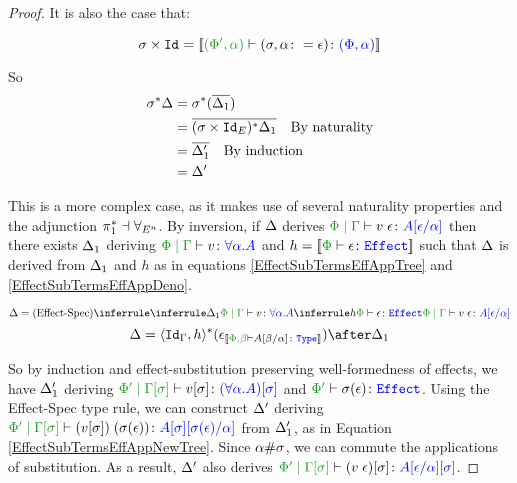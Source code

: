 \documentclass{Report}
\begin{document}
\begin{framed}
\begin{proof}
    It is also the case that:
    
    \begin{equation}
        \si\times\Id{} = \deno{\typerelation{(\P',\a)}{(\si, \a\setto\e)}{(\P,\a)}}
    \end{equation}
    
    So
    \begin{align*}
        \sigma^*\Delta &= \sigma^*(\overline{\Delta_1})\\
        & = \overline{(\sigma\times\texttt{Id}_{E})^*\Delta_1}\quad\text{By naturality}\\
        & = \overline{\Delta_1'}\quad\text{By induction}\\
        & = \Delta'
    \end{align*}
    
    \case{\vspec}
    
    This is a more complex case, as it makes use of several naturality properties and the adjunction $\pi_1^*\dashv\forall_{E^n}$. By inversion, if $\Delta$ derives $\gpetyperelation{\eapp{v}{\e}}{A\ssub{\a}{\e}}$ then there exists $\Delta_1$ deriving $\gpetyperelation{v}{\all{\a}{A}}$ and $h = \deno{\typerelation{\P}{\e}{\effect}}$ such that $\Delta$ is derived from $\Delta_1$ and $h$ as in equations \ref{EffectSubTermsEffAppTree} and \ref{EffectSubTermsEffAppDeno}.
    
    
    \begin{equation}\label{EffectSubTermsEffAppTree}
        \D = \ntreeruleII{\vspec}{\treeruleI{\D_1}{\gpetyperelation{v}{\all{\a}{A}}}}{\treeruleI{h}{\typerelation{\P}{\e}{\effect}}}{\gpetyperelation{\eapp{v}{\e}}{A\ssub{\a}{\e}}}
    \end{equation}
    \begin{equation}\label{EffectSubTermsEffAppDeno}
        \D = \pr{\Id{\G}}{h}\star(\e_{\deno{\typerelation{\P,\b}{A\ssub{\a}{\b}}{\type}}})\after\D_1
    \end{equation}
    
    So by induction and effect-substitution preserving well-formedness of effects, we have $\Delta_1'$ deriving $\etyperelation{\P'}{\G\ssi}{v\ssi}{(\all{\a}{A})\ssi}$ and $\wellformedeffect{\P'}{\si(\e)}$. Using the Effect-Spec type rule, we can construct $\Delta'$ deriving $\etyperelation{\P'}{\G\ssi}{\eapp{(v\ssi)}{(\si(\e))}}{A\ssi\ssub{\a}{\si(\e)}}$ from $\Delta_1'$, as in Equation \ref{EffectSubTermsEffAppNewTree}. Since $\alpha\#\sigma$, we can commute the applications of substitution. As a result, $\Delta'$ also derives $\etyperelation{\P'}{\G\ssi}{(\eapp{v}{\e})\ssi}{A\ssub{\a}{\e}\ssi}$.
    

\end{proof}
\end{framed}
\end{document}
